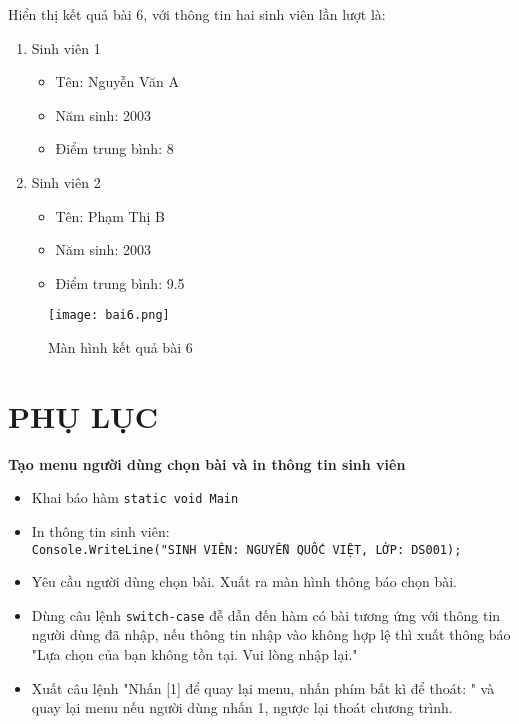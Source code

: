 \documentclass[a4paper]{article}
\begin{document}
Hiển thị kết quả bài 6, với thông tin hai sinh viên lần lượt là:
\begin{enumerate}
    \item Sinh viên 1
    \begin{itemize}
        \item Tên: Nguyễn Văn A
        \item Năm sinh: 2003
        \item Điểm trung bình: 8
    \end{itemize}
    \item Sinh viên 2
    \begin{itemize}
        \item Tên: Phạm Thị B
        \item Năm sinh: 2003
        \item Điểm trung bình: 9.5
    \end{itemize}
\end{enumerate}
        \begin{figure}[!h]
        \centering
        \texttt{[image: bai6.png]}
        \caption{Màn hình kết quả bài 6}
    \end{figure}

\pagebreak
\section{PHỤ LỤC}
\textbf{Tạo menu người dùng chọn bài và in thông tin sinh viên}
\begin{itemize}
    \item Khai báo hàm \texttt{static void Main}
    \item In thông tin sinh viên:\\
    \texttt{Console.WriteLine("SINH VIÊN: NGUYỄN QUỐC VIỆT, LỚP: DS001);}\\
    \item Yêu cầu người dùng chọn bài. Xuất ra màn hình thông báo chọn bài.
    \item Dùng câu lệnh \texttt{switch-case} đễ dẫn đến hàm có bài tương ứng với thông tin người dùng đã nhập, nếu thông tin nhập vào không hợp lệ thì xuất thông báo "Lựa chọn của bạn không tồn tại. Vui lòng nhập lại."
    \item Xuất câu lệnh "Nhấn [1] để quay lại menu, nhấn phím bất kì để thoát: " và quay lại menu nếu người dùng nhấn 1, ngược lại thoát chương trình.
\end{itemize}
\end{document}
